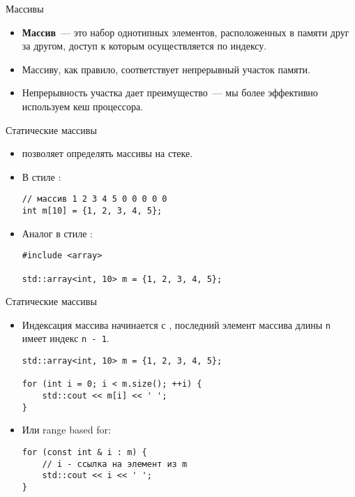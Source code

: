 \documentclass{beamer}
\begin{document}
\begin{frame}[fragile]{Массивы}
    \begin{itemize}
        \item {\bf Массив}~--- это набор однотипных элементов, расположенных в памяти
            друг за другом, доступ к которым осуществляется по индексу.
        \item Массиву, как правило, соответствует непрерывный участок памяти.
        \item Непрерывность участка дает преимущество~--- мы более эффективно используем кеш процессора.
    \end{itemize}
\end{frame}

\begin{frame}[fragile]{Статические массивы}
    \begin{itemize}
        \item \langcpp позволяет определять массивы на стеке.
        \item В стиле \langc:
            \begin{lstlisting}
// массив 1 2 3 4 5 0 0 0 0 0
int m[10] = {1, 2, 3, 4, 5}; 
            \end{lstlisting}
        \item Аналог в стиле \langcpp:
            \begin{lstlisting}
#include <array>

std::array<int, 10> m = {1, 2, 3, 4, 5}; 
            \end{lstlisting}
    \end{itemize}
\end{frame}

\begin{frame}[fragile]{Статические массивы}
    \begin{itemize}
        \item Индексация массива начинается с , последний элемент
            массива длины {\tt n} имеет индекс {\tt n - 1}.
            \begin{lstlisting}
std::array<int, 10> m = {1, 2, 3, 4, 5}; 

for (int i = 0; i < m.size(); ++i) {
    std::cout << m[i] << ' '; 
}
            \end{lstlisting}
        \item Или range based for:
            \begin{lstlisting}
for (const int & i : m) {
    // i - ссылка на элемент из m
    std::cout << i << ' '; 
}
            \end{lstlisting}
    \end{itemize}
\end{frame}
\end{document}
